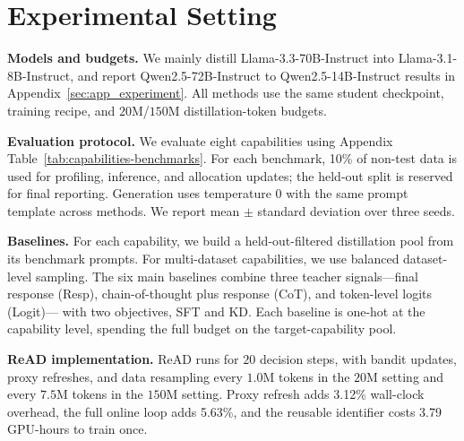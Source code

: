 \section{Experimental Setting}
\label{subsec:exp_setup}

\textbf{Models and budgets.}
We mainly distill Llama-3.3-70B-Instruct into Llama-3.1-8B-Instruct, and report
Qwen2.5-72B-Instruct to Qwen2.5-14B-Instruct results in
Appendix~\ref{sec:app_experiment}. All methods use the same student checkpoint,
training recipe, and $20$M/$150$M distillation-token budgets.

\textbf{Evaluation protocol.}
We evaluate eight capabilities using Appendix
Table~\ref{tab:capabilities-benchmarks}. For each benchmark, 10\% of non-test
data is used for profiling,  inference, and allocation updates; the
held-out split is reserved for final reporting. Generation uses temperature $0$
with the same prompt template across methods. We report mean $\pm$ standard
deviation over three seeds.

\textbf{Baselines.}
For each capability, we build a held-out-filtered distillation pool from its
benchmark prompts. For multi-dataset capabilities, we use balanced dataset-level
sampling. The six main baselines combine three teacher signals---final response
(Resp), chain-of-thought plus response (CoT), and token-level logits (Logit)---
with two objectives, SFT and KD. Each baseline is one-hot at the capability
level, spending the full budget on the target-capability pool.

\textbf{ReAD implementation.}
ReAD runs for $20$ decision steps, with bandit updates, proxy refreshes, and data
resampling every $1.0$M tokens in the $20$M setting and every $7.5$M tokens in
the $150$M setting. Proxy refresh adds 3.12\% wall-clock overhead, the full online loop adds
5.63\%, and the reusable  identifier costs 3.79 GPU-hours to train
once.

